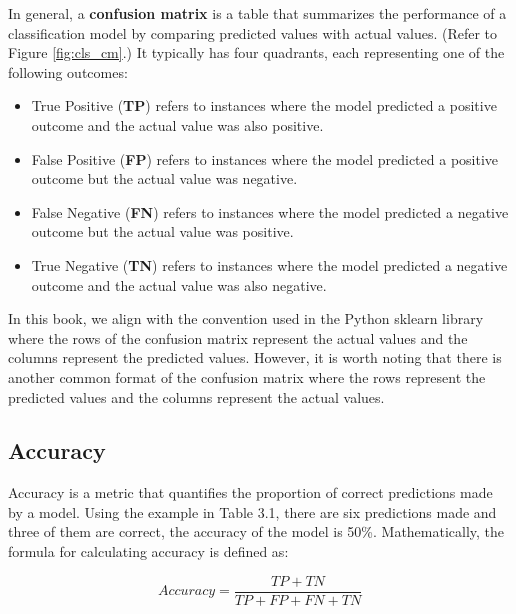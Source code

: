 In general, a \textbf{confusion matrix} is a table that summarizes the performance of a classification model by comparing predicted values with actual values. (Refer to Figure \ref{fig:cls_cm}.) It typically has four quadrants, each representing one of the following outcomes:

\begin{itemize}
  \item True Positive (\textbf{TP}) refers to instances where the model predicted a positive outcome and the actual value was also positive.
  \item False Positive (\textbf{FP}) refers to instances where the model predicted a positive outcome but the actual value was negative.
  \item False Negative (\textbf{FN}) refers to instances where the model predicted a negative outcome but the actual value was positive.
  \item True Negative (\textbf{TN}) refers to instances where the model predicted a negative outcome and the actual value was also negative.
\end{itemize}

In this book, we align with the convention used in the Python sklearn library where the rows of the confusion matrix represent the actual values and the columns represent the predicted values. However, it is worth noting that there is another common format of the confusion matrix where the rows represent the predicted values and the columns represent the actual values.

\subsection{Accuracy}
Accuracy is a metric that quantifies the proportion of correct predictions made by a model. Using the example in Table 3.1, there are six predictions made and three of them are correct, the accuracy of the model is 50\%. Mathematically, the formula for calculating accuracy is defined as:

\begin{equation}\label{eqn_acc}
  Accuracy = \frac{TP + TN}{TP+FP+FN+TN}
\end{equation}

